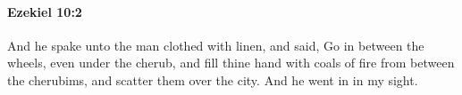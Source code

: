 
		\paragraph{Ezekiel 10:2} %
			\label{EZEKIEL-10-2}

			And he spake unto the man clothed with linen, and said, Go in between the wheels, even under the cherub, and fill thine hand with coals of fire from between the cherubims, and scatter them over the city. And he went in in my sight.


